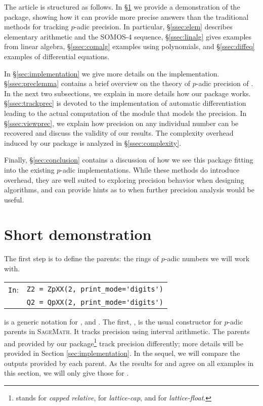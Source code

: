 \documentclass[sigconf]{acmart}
\newcommand{\sage}{\textsc{SageMath}\xspace}
\newcommand{\ZpCR}{\text{\color{output} \rm \tt ZpCR}\xspace}
\newcommand{\ZpLC}{\text{\color{output} \rm \tt ZpLC}\xspace}
\newcommand{\ZpLF}{\text{\color{output} \rm \tt ZpLF}\xspace}
\newcommand{\ZpXX}{\text{\color{output} \rm \tt ZpXX}\xspace}
\newcommand{\cIn}{{\color{input} \tt \phantom{Zp}In}:}
\theoremstyle{definition}
\begin{document}
The article is structured as follows. In \S \ref{sec:demo} we provide a demonstration
of the package, showing how it can provide more precise answers than the
traditional methods for tracking $p$-adic precision.  In particular, \S \ref{ssec:elem}
describes elementary arithmetic and the SOMOS-4 sequence, \S \ref{ssec:linalg}
gives examples from linear algebra, \S \ref{ssec:comalg} examples using polynomials,
and \S \ref{ssec:diffeq} examples of differential equations.

In \S \ref{sec:implementation} we give more details on the implementation.
\S \ref{ssec:preclemma} contains a brief overview on the theory of
$p$-adic precision of \cite{caruso-roe-vaccon:14a}. 
In the next two subsections, we explain in more details how our package
works. \S \ref{ssec:trackprec} is devoted to the implementation of 
automatic differentiation leading to the actual computation of the
module that models the precision.
In \S \ref{ssec:viewprec}, we explain how precision on any individual number
can be recovered and discuss the validity
of our results.
The complexity overhead induced by our package is analyzed in
\S \ref{ssec:complexity}.

Finally, \S \ref{sec:conclusion} contains a discussion of how we see this
package fitting into the existing $p$-adic implementations.  While these
methods do introduce overhead, they are well suited to exploring
precision behavior when designing algorithms, and can provide
hints as to when further precision analysis would be useful.

\section{Short demonstration}
\label{sec:demo}

The first step is to define the parents: the rings of $p$-adic
numbers we will work with.

\smallskip

{\noindent \small
\begin{tabular}{rl}
\cIn
 & {\color{ring}\verb?Z2?}\verb? = ?{\color{output}\verb?ZpXX?}\verb?(2, print_mode=?{\color{string}\verb?'digits'?}\verb?)? \\
 & {\color{ring}\verb?Q2?}\verb? = ?{\color{output}\verb?QpXX?}\verb?(2, print_mode=?{\color{string}\verb?'digits'?}\verb?)? \\
\end{tabular}}

\smallskip

\noindent
\ZpXX is a generic notation for \ZpCR, \ZpLC and \ZpLF.
The first, \ZpCR, is the usual constructor for $p$-adic parents in 
\sage. It tracks 
precision using interval arithmetic. The parents 
\ZpLC and \ZpLF provided by our package\footnote{ stands for \textit{capped relative},
 for \textit{lattice-cap}, and  for \textit{lattice-float}.}
track precision differently; more details will be provided in Section \ref{sec:implementation}.
In the sequel, we will compare the outputs provided by each parent.
As the results for \ZpLF and \ZpLC agree on all examples in this section, 
we will only give those for \ZpLC.
\end{document}
